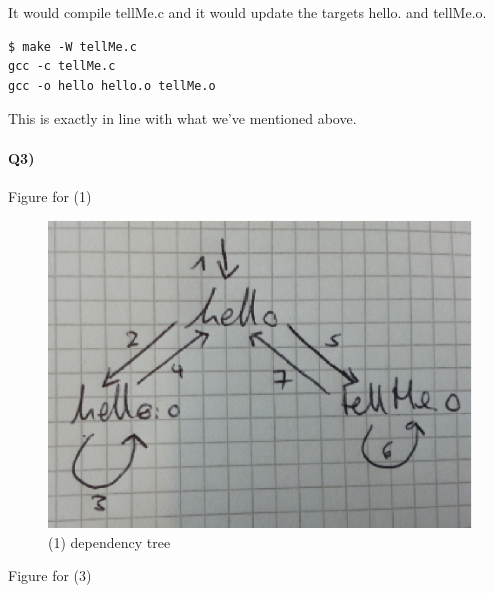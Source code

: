 \documentclass[12pt]{article}
\begin{document}
It would compile tellMe.c and it would update the targets hello. and tellMe.o.

\begin{lstlisting}
$ make -W tellMe.c
gcc -c tellMe.c
gcc -o hello hello.o tellMe.o
\end{lstlisting}

This is exactly in line with what we've mentioned above.


\paragraph{Q3)}

Figure for (1)

\begin{figure}[!htb]
\centering
\includegraphics[scale=0.5]{make_dep_q3_1.eps} 
\caption{(1) dependency tree}
\end{figure}

Figure for (3)
\end{document}

